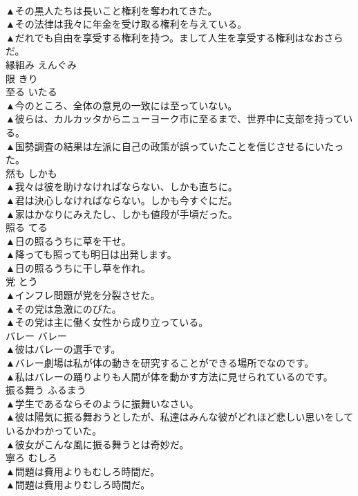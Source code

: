\documentclass[8pt]{extreport}
\begin{document}
\begin{CJK}{UTF8}{min}
\\	▲その黒人たちは長いこと権利を奪われてきた。 
\\	▲その法律は我々に年金を受け取る権利を与えている。 
\\	▲だれでも自由を享受する権利を持つ。まして人生を享受する権利はなおさらだ。 
\\	縁組み	えんぐみ	
\\	限	きり	
\\	至る	いたる	
\\	▲今のところ、全体の意見の一致には至っていない。 
\\	▲彼らは、カルカッタからニューヨーク市に至るまで、世界中に支部を持っている。 
\\	▲国勢調査の結果は左派に自己の政策が誤っていたことを信じさせるにいたった。 
\\	然も	しかも	
\\	▲我々は彼を助けなければならない、しかも直ちに。 
\\	▲君は決心しなければならない。しかも今すぐにだ。 
\\	▲家はかなりにみえたし、しかも値段が手頃だった。 
\\	照る	てる	
\\	▲日の照るうちに草を干せ。 
\\	▲降っても照っても明日は出発します。 
\\	▲日の照るうちに干し草を作れ。 
\\	党	とう	
\\	▲インフレ問題が党を分裂させた。 
\\	▲その党は急激にのびた。 
\\	▲その党は主に働く女性から成り立っている。 
\\	バレー	バレー	
\\	▲彼はバレーの選手です。 
\\	▲バレー劇場は私が体の動きを研究することができる場所でなのです。 
\\	▲私はバレーの踊りよりも人間が体を動かす方法に見せられているのです。 
\\	振る舞う	ふるまう	
\\	▲学生であるならそのように振舞いなさい。 
\\	▲彼は陽気に振る舞おうとしたが、私達はみんな彼がどれほど悲しい思いをしているかわかっていた。 
\\	▲彼女がこんな風に振る舞うとは奇妙だ。 
\\	寧ろ	むしろ	
\\	▲問題は費用よりもむしろ時間だ。 
\\	▲問題は費用よりむしろ時間だ。 

\end{CJK}
\end{document}
